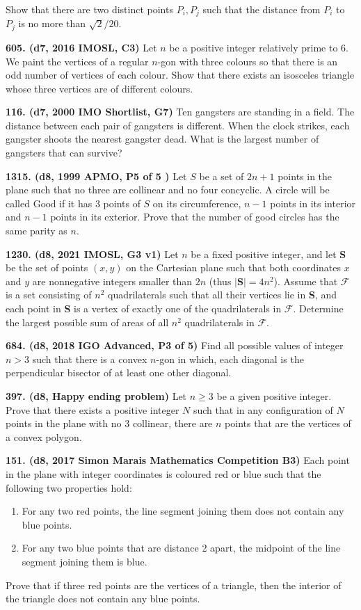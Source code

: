 \documentclass{article}
\begin{document}
Show that there are two distinct points $P_{i}, P_{j}$ such that the distance from $P_{i}$ to $P_{j}$ is no more than $\sqrt{2} / 20$.

\textbf{605. (\color{red}d7\color{black}, 2016 IMOSL, C3)} Let $n$ be a positive integer relatively prime to $6$. We paint the vertices of a regular $n$-gon with three colours so that there is an odd number of vertices of each colour. Show that there exists an isosceles triangle whose three vertices are of different colours.

\textbf{116. (\color{red}d7\color{black}, 2000 IMO Shortlist, G7)} Ten gangsters are standing in a field. The distance between each pair of gangsters is different. When the clock strikes, each gangster shoots the nearest gangster dead. What is the largest number of gangsters that can survive?

\textbf{1315. (\color{red}d8\color{black}, 1999 APMO, P5 of 5 )} Let $S$ be a set of $2n+1$ points in the plane such that no three are collinear and no four concyclic. A circle will be called $\text{Good}$ if it has 3 points of $S$ on its circumference, $n-1$ points in its interior and $n-1$ points in its exterior.
Prove that the number of good circles has the same parity as $n$.

\textbf{1230. (\color{red}d8\color{black}, 2021 IMOSL, G3 v1)} Let $n$ be a fixed positive integer, and let \textbf{S} be the set of points $(x,y)$ on the Cartesian plane such that both coordinates $x$ and $y$ are nonnegative integers smaller than $2n$ (thus $|\textbf{S}| = 4n^2$). Assume that $\mathcal{F}$ is a set consisting of $n^2$ quadrilaterals such that all their vertices lie in \textbf{S}, and each point in \textbf{S} is a vertex of exactly one of the quadrilaterals in $\mathcal{F}$. Determine the largest possible sum of areas of all $n^2$ quadrilaterals in $\mathcal{F}$.

\textbf{684. (\color{red}d8\color{black}, 2018 IGO Advanced, P3 of 5)} Find all possible values of integer $n > 3$ such that there is a convex $n$-gon in which, each diagonal is the perpendicular bisector of at least one other diagonal.

\textbf{397. (\color{red}d8\color{black}, Happy ending problem)} Let $n \geq 3$ be a given positive integer. Prove that there exists a positive integer $N$ such that in any configuration of $N$ points in the plane with no $3$ collinear, there are $n$ points that are the vertices of a convex polygon. 

\textbf{151. (\color{red}d8\color{black}, 2017 Simon Marais Mathematics Competition B3)} Each point in the plane with integer coordinates is coloured red or blue such that the following two properties hold:
\begin{enumerate}
\item For any two red points, the line segment joining them does not contain any blue points.
\item For any two blue points that are distance 2 apart, the midpoint of the line segment joining them is blue.
\end{enumerate}
Prove that if three red points are the vertices of a triangle, then the interior of the triangle does not contain any blue points.
\end{document}
